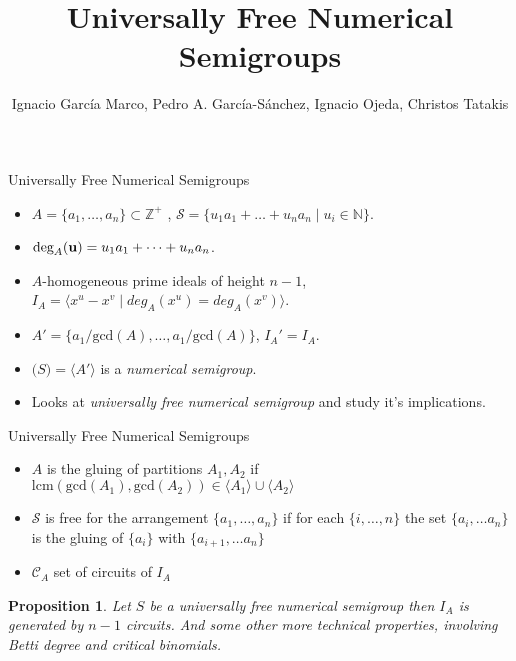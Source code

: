 \documentclass[9pt]{beamer}
\author{ Ignacio García Marco, Pedro A. García-Sánchez, Ignacio Ojeda, Christos Tatakis }
\title{Universally Free Numerical Semigroups}
\institute[]{

}
\date{

}
\newcommand\set[1]{\{#1\}}
\newtheorem*{prop}{Proposition}
\newcommand{\ZZ}{\mathbb Z}
\theoremstyle{definition}
\begin{document}
\maketitle


\begin{frame}[fragile]{Universally Free Numerical Semigroups}
  
  \begin{itemize}
  \item $ A = \set{a_1, \dots, a_n} \subset \ZZ^+$  , $\mathcal{S} = \set{u_1a_1 + \dots + u_n a_n \mid u_i \in \mathbb{N}}$.
  \item $\text{deg}_A(\bold{u}) = u_1a_1 + \dots + u_n a_n$.
  \item $A$-homogeneous prime ideals of height $n-1$, $I_A = \langle x^u - x^v \mid deg_A(x^u) = deg_A(x^v) \rangle$.

  \item $A' = \set{a_1 / \text{gcd}(A), \dots, a_1 / \text{gcd}(A) }$, $I_A' = I_A$.
  \item $\mathcal(S) = \langle A' \rangle$ is a \emph{numerical semigroup}.
  \item Looks at \emph{universally free numerical semigroup} and study it's implications.
    
    
  \end{itemize}
\end{frame}


\begin{frame}[fragile]{Universally Free Numerical Semigroups}
  
  \begin{itemize}
  \item $A$ is the gluing of partitions $A_1, A_2$ if $\text{lcm}(\text{gcd}(A_1), \text{gcd}(A_2)) \in \langle A_1 \rangle \cup \langle A_2 \rangle$
  \item $\mathcal{S}$ is free for the arrangement $\set{a_1, \dots, a_n}$ if for each $\set{i, \dots, n}$ the set $\set{a_i, \dots a_n}$ is the gluing of $\set{a_i}$ with $\set{a_{i+1}, \dots a_n}$
  \item $\mathcal{C}_A$ set of circuits of $I_A$
  \end{itemize}

  \begin{prop}
    Let $S$ be a universally free numerical semigroup then $I_A$ is generated by $n-1$ circuits. And some other more technical properties, involving Betti degree and critical binomials.
  \end{prop}

\end{frame}
\end{document}
